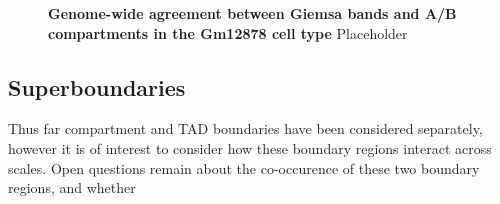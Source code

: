 \documentclass[a4paper,10pt,oneside]{book}
\begin{document}
\begin{figure}
\begin{center} 
\captionsetup{width=\textwidth}
\caption{ {\bf Genome-wide agreement between Giemsa bands and A/B compartments in the Gm12878 cell type}
Placeholder
}\label{fig:gbands2}
\end{center}
\end{figure} 

\subsection{Superboundaries}

Thus far compartment and TAD boundaries have been considered separately, however it is of interest to consider how these boundary regions interact across scales. Open questions remain about the co-occurence of these two boundary regions, and whether 


\ifstandalone
\begin{small}

\end{small}
\fi
\end{document}
